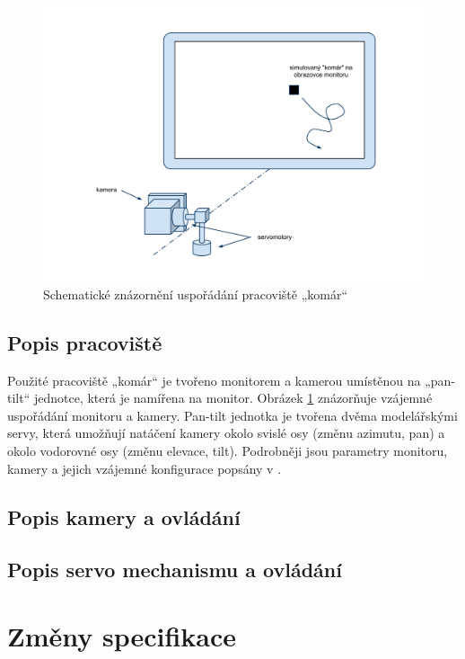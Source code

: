 \documentclass[a4paper,10pt]{article}
\begin{document}
		\begin{figure}[!h]
			\centering
			 \includegraphics[width=1\columnwidth]{pics/usporadani_pracoviste}
			 \caption{Schematické znázornění uspořádání pracoviště „komár“}\label{fig:usporadaniPracoviste}
		\end{figure}

	\subsection{Popis pracoviště}

		Použité pracoviště „komár“ je tvořeno monitorem a kamerou umístěnou na „pan-tilt“ jednotce, která je namířena
		na monitor. Obrázek \ref{fig:usporadaniPracoviste} znázorňuje vzájemné uspořádání monitoru a kamery.
		Pan-tilt jednotka je tvořena dvěma mo\-de\-lář\-ský\-mi servy, která umožňují natáčení kamery okolo svislé osy
		(změnu azimutu, pan) a okolo vodorovné osy (změnu elevace, tilt).
		Podrobněji jsou parametry monitoru, kamery a jejich vzájemné konfigurace popsány v \cite{kamera}.

	\subsection{Popis kamery a ovládání}

	\subsection{Popis servo mechanismu a ovládání}

\section{Změny specifikace}
\end{document}
